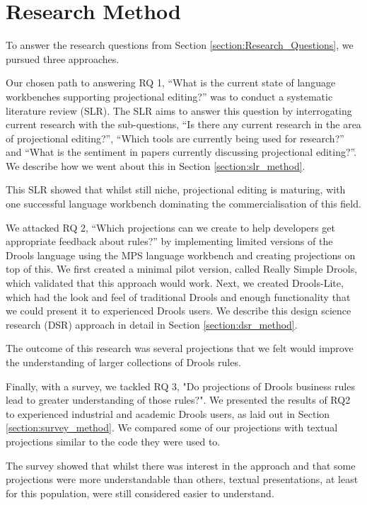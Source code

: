 \section{Research Method}
\label{section:Research_Method}

To answer the research questions from Section \ref{section:Research_Questions}, we pursued three approaches.

Our chosen path to answering RQ 1, ``What is the current state of language workbenches supporting projectional editing?'' was to conduct a systematic literature review (SLR).
The SLR aims to answer this question by interrogating current research with the sub-questions, ``Is there any current research in the area of projectional editing?'',  ``Which tools are currently being used for research?'' and ``What is the sentiment in papers currently discussing projectional editing?''.
We describe how we went about this in Section \ref{section:slr_method}. 

This SLR showed that whilst still niche, projectional editing is maturing, with one successful language workbench dominating the commercialisation of this field.

We attacked RQ 2, ``Which projections can we create to help developers get appropriate feedback about rules?'' by implementing limited versions of the Drools language using the MPS language workbench and creating projections on top of this.
We first created a minimal pilot version, called Really Simple Drools, which validated that this approach would work.
Next, we created Drools-Lite, which had the look and feel of traditional Drools and enough functionality that we could present it to experienced Drools users.
We describe this design science research (DSR) approach in detail in Section \ref{section:dsr_method}.

The outcome of this research was several projections that we felt would improve the understanding of larger collections of Drools rules.

Finally, with a survey, we tackled RQ 3, "Do projections of Drools business rules lead to greater understanding of those rules?".
We presented the results of RQ2 to experienced industrial and academic Drools users, as laid out in Section \ref{section:survey_method}.
We compared some of our projections with textual projections similar to the code they were used to.

The survey showed that whilst there was interest in the approach and that some projections were more understandable than others, textual presentations, at least for this population, were still considered easier to understand.